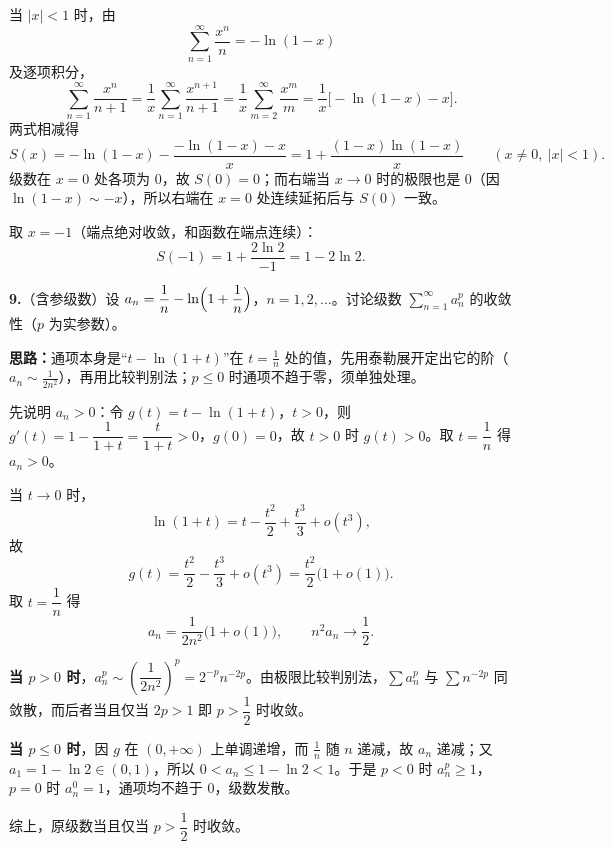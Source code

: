 当 $|x|<1$ 时，由
\[
\sum_{n=1}^{\infty}\frac{x^{n}}{n}=-\ln(1-x)
\]
及逐项积分，
\[
\sum_{n=1}^{\infty}\frac{x^{n}}{n+1}
=\frac{1}{x}\sum_{n=1}^{\infty}\frac{x^{n+1}}{n+1}
=\frac{1}{x}\sum_{m=2}^{\infty}\frac{x^{m}}{m}
=\frac{1}{x}\bigl[-\ln(1-x)-x\bigr].
\]
两式相减得
\[
S(x)=-\ln(1-x)-\frac{-\ln(1-x)-x}{x}
=1+\frac{(1-x)\ln(1-x)}{x}\qquad(x\ne0,\ |x|<1).
\]
级数在 $x=0$ 处各项为 $0$，故 $S(0)=0$；而右端当 $x\to0$ 时的极限也是 $0$（因 $\ln(1-x)\sim-x$），所以右端在 $x=0$ 处连续延拓后与 $S(0)$ 一致。

取 $x=-1$（端点绝对收敛，和函数在端点连续）：
\[
S(-1)=1+\frac{2\ln2}{-1}=1-2\ln2.
\]


\else \answerarea[10] \fi%
\textbf{9.}（含参级数）设 $a_{n}=\dfrac{1}{n}-\ln\Bigl(1+\dfrac{1}{n}\Bigr)$，$n=1,2,\dots$。讨论级数 $\displaystyle\sum_{n=1}^{\infty}a_{n}^{p}$ 的收敛性（$p$ 为实参数）。

\ifshowsolutions%
\textbf{思路：}通项本身是“$t-\ln(1+t)$”在 $t=\frac1n$ 处的值，先用泰勒展开定出它的阶（$a_{n}\sim\frac{1}{2n^{2}}$），再用比较判别法；$p\le0$ 时通项不趋于零，须单独处理。

先说明 $a_{n}>0$：令 $g(t)=t-\ln(1+t)$，$t>0$，则 $g'(t)=1-\dfrac{1}{1+t}=\dfrac{t}{1+t}>0$，$g(0)=0$，故 $t>0$ 时 $g(t)>0$。取 $t=\dfrac{1}{n}$ 得 $a_{n}>0$。

当 $t\to0$ 时，
\[
\ln(1+t)=t-\frac{t^{2}}{2}+\frac{t^{3}}{3}+o(t^{3}),
\]
故
\[
g(t)=\frac{t^{2}}{2}-\frac{t^{3}}{3}+o(t^{3})
=\frac{t^{2}}{2}\bigl(1+o(1)\bigr).
\]
取 $t=\dfrac1n$ 得
\[
a_{n}=\frac{1}{2n^{2}}\bigl(1+o(1)\bigr),\qquad
n^{2}a_{n}\to\frac{1}{2}.
\]

\textbf{当 $p>0$ 时}，$a_{n}^{p}\sim\left(\dfrac{1}{2n^{2}}\right)^{p}=2^{-p}n^{-2p}$。由极限比较判别法，$\sum a_{n}^{p}$ 与 $\sum n^{-2p}$ 同敛散，而后者当且仅当 $2p>1$ 即 $p>\dfrac{1}{2}$ 时收敛。

\textbf{当 $p\le0$ 时}，因 $g$ 在 $(0,+\infty)$ 上单调递增，而 $\frac1n$ 随 $n$ 递减，故 $a_{n}$ 递减；又 $a_{1}=1-\ln2\in(0,1)$，所以 $0<a_{n}\le1-\ln2<1$。于是 $p<0$ 时 $a_{n}^{p}\ge1$，$p=0$ 时 $a_{n}^{0}=1$，通项均不趋于 $0$，级数发散。

综上，原级数当且仅当 $p>\dfrac{1}{2}$ 时收敛。


\else \answerarea[10] \fi%
